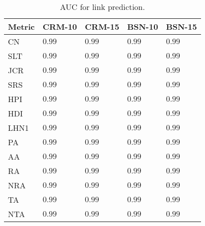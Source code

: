 \begin{table}[h]
	\centering
	\begin{tabular}{l l l l l}
	\toprule
	\textbf{Metric} & \textbf{CRM-10} & \textbf{CRM-15} & \textbf{BSN-10} & \textbf{BSN-15}\\
	\midrule
		CN & $0.99$ & $0.99$ & $0.99$ & $0.99$ \\
		SLT  & $0.99$ & $0.99$ & $0.99$ & $0.99$ \\
		JCR  & $0.99$ & $0.99$ & $0.99$ & $0.99$ \\
		SRS   & $0.99$ & $0.99$ & $0.99$ & $0.99$ \\
		HPI  & $0.99$ & $0.99$ & $0.99$ & $0.99$ \\
		HDI  & $0.99$ & $0.99$ & $0.99$ & $0.99$ \\
		LHN1  & $0.99$ & $0.99$ & $0.99$ & $0.99$ \\
		PA  & $0.99$ & $0.99$ & $0.99$ & $0.99$ \\
		AA  & $0.99$ & $0.99$ & $0.99$ & $0.99$ \\
		RA  & $0.99$ & $0.99$ & $0.99$ & $0.99$ \\
		NRA  & $0.99$ & $0.99$ & $0.99$ & $0.99$ \\
		TA  & $0.99$ & $0.99$ & $0.99$ & $0.99$ \\
		NTA  & $0.99$ & $0.99$ & $0.99$ & $0.99$ \\
	\bottomrule
	\end{tabular}
	\label{tab:auc-prediction}
	\caption{AUC for link prediction.}
\end{table}	
     


